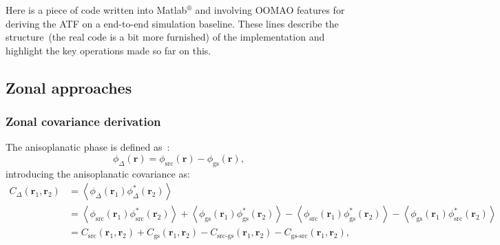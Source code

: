 \documentclass[12pt]{article}
\newcommand{\aver}[1]{\left\langle #1 \right\rangle}
\newcommand{\rbb}{\boldsymbol{r}}
\newcommand{\rbun}{\boldsymbol{r}_1}
\newcommand{\rbdeux}{\boldsymbol{r}_2}
\begin{document}
Here is a piece of code written into Matlab$^{\circledR}$ and involving OOMAO features for deriving the ATF on a end-to-end simulation baseline. These lines describe the structure~(the real code is a bit more furnished) of the implementation and highlight the key operations made so far on this.
\begin{center}
\end{center}


\subsection{Zonal approaches}
\subsubsection{Zonal covariance derivation}
The anisoplanatic phase is defined as~:
\begin{equation}
\phi_\Delta(\rbb) = \phi_\text{src}(\rbb) - \phi_\text{gs}(\rbb),
\end{equation}
introducing the anisoplanatic covariance as:
\begin{equation} \label{E:cov}
	\begin{aligned}
	C_\Delta(\rbun,\rbdeux) &= \aver{\phi_\Delta(\rbun)\phi^*_\Delta(\rbdeux)}\\
	&=  \aver{\phi_\text{src}(\rbun)\phi^*_\text{src}(\rbdeux)} + \aver{\phi_\text{gs}(\rbun)\phi^*_\text{gs}(\rbdeux)} - \aver{\phi_\text{src}(\rbun)\phi^*_\text{gs}(\rbdeux)}- \aver{\phi_\text{gs}(\rbun)\phi^*_\text{src}(\rbdeux)}\\ 
	&= C_\text{src}(\rbun,\rbdeux) + C_\text{gs}(\rbun,\rbdeux) - C_\text{src-gs}(\rbun,\rbdeux) - C_\text{gs-src}(\rbun,\rbdeux),
	\end{aligned}
\end{equation}
						
\end{document}
